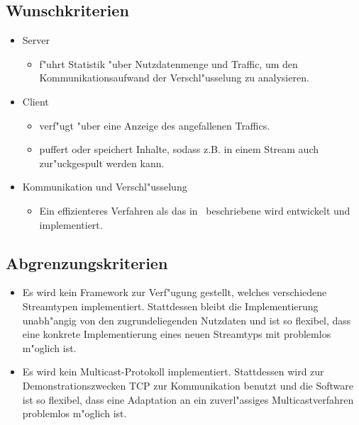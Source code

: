 \documentclass[a4paper,10pt]{scrartcl}
\begin{document}
\subsection{Wunschkriterien}

\begin{itemize}

\item Server
\begin{itemize}
   \item f"uhrt Statistik "uber Nutzdatenmenge und Traffic, um den Kommunikationsaufwand
         der Verschl"usselung zu analysieren.
\end{itemize}

\item Client
\begin{itemize}
   \item verf"ugt "uber eine Anzeige des angefallenen Traffics.
   \item puffert oder speichert Inhalte, sodass z.B. in einem Stream auch
         zur"uckgespult werden kann.
\end{itemize}

\item Kommunikation und Verschl"usselung
\begin{itemize}
   \item Ein effizienteres Verfahren als das in~\cite{Naor00} beschriebene wird
         entwickelt und implementiert.
\end{itemize}
\end{itemize}

\subsection{Abgrenzungskriterien}
\begin{itemize}
   \item Es wird kein Framework zur Verf"ugung gestellt, welches verschiedene
         Streamtypen implementiert. Stattdessen bleibt die Implementierung
         unabh"angig von den zugrundeliegenden Nutzdaten und ist so flexibel,
         dass eine konkrete Implementierung eines neuen Streamtyps mit
         problemlos m"oglich ist.
   \item Es wird kein Multicast-Protokoll implementiert. Stattdessen wird
         zur Demonstrationszwecken TCP zur Kommunikation benutzt und die Software
         ist so flexibel, dass eine Adaptation an ein zuverl"assiges
         Multicastverfahren problemlos m"oglich ist.
\end{itemize}
\end{document}
